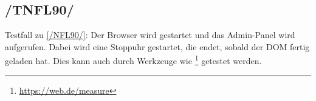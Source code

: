 \subsection*{/TNFL90/}

\label{/TNFL90/} Testfall zu \ref{/NFL90/}: Der \Gls{Browser} wird gestartet und das \Gls{Admin-Panel} wird aufgerufen.
Dabei wird eine Stoppuhr gestartet, die endet, sobald der \Gls{DOM} fertig geladen hat.
Dies kann auch durch Werkzeuge wie \footnote{\href{https://web.dev/measure}{https://web.de/measure}} getestet werden.